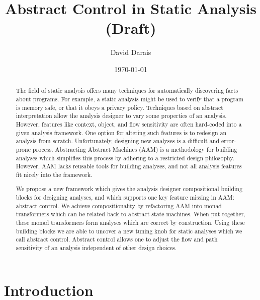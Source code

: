 \documentclass{article}
\title{Abstract Control in Static Analysis (Draft)}
\author{David Darais}
\date{\today}
\begin{document}
\maketitle


\begin{abstract}

The field of static analysis offers many techniques for automatically discovering facts about programs.
For example, a static analysis might be used to verify that a program is memory safe, or that it obeys a privacy policy.
Techniques based on abstract interpretation allow the analysis designer to vary some properties of an analysis.
However, features like context, object, and flow sensitivity are often hard-coded into a given analysis framework.
One option for altering such features is to redesign an analysis from scratch.
Unfortunately, designing new analyses is a difficult and error-prone process.
Abstracting Abstract Machines (AAM) is a methodology for building analyses which simplifies this process by adhering to a restricted design philosophy.
However, AAM lacks reusable tools for building analyses, and not all analysis features fit nicely into the framework.

We propose a new framework which gives the analysis designer compositional building blocks for designing analyses, and which supports one key feature missing in AAM: abstract control.
We achieve compositionality by refactoring AAM into monad transformers which can be related back to abstract state machines.
When put together, these monad transformers form analyses which are correct by construction.
Using these building blocks we are able to uncover a new tuning knob for static analyses which we call abstract control.
Abstract control allows one to adjust the flow and path sensitivity of an analysis independent of other design choices.

\end{abstract}

\tableofcontents

\section{Introduction}
\label{section:Introduction}
\end{document}
